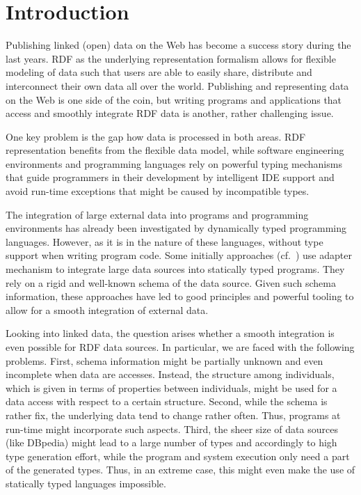 \documentclass{llncs} %
\begin{document}
\section{Introduction}
\label{sec:intro}


Publishing linked (open) data on the Web has become a success story during the last years.
RDF as the underlying representation formalism allows for flexible modeling of data such that
users are able to easily share, distribute and interconnect their own data all over the world.
Publishing and representing data on the Web is one side of the coin, but writing programs
and applications that access and smoothly integrate RDF data  is another, rather challenging issue.

One key problem is the  gap how data is processed in both areas.
RDF representation benefits from the flexible data model,
while software engineering environments and programming languages rely on powerful typing mechanisms
that guide programmers in their development by intelligent IDE support
and avoid run-time exceptions that might be caused by incompatible types.


The integration of large external data into programs and programming environments
has already been investigated by dynamically typed programming languages.
However, as it is in the nature of these languages, without type support when writing program code.
Some initially approaches (cf.~\cite{Syme2012fsharp}) use adapter mechanism to integrate large data sources into statically
typed programs. They rely on a rigid and well-known schema of the data source.
Given such schema information, these approaches have led to good principles and powerful tooling to
allow for a smooth integration of external data.

Looking into linked data, the question arises whether
a smooth integration is even possible for RDF data sources.
In particular, we are faced with the following problems.
First, schema information might be partially unknown and even incomplete when data are accesses.
Instead, the structure among individuals, which is given in terms of properties between individuals,
might be used for a data access with respect to a certain structure.
Second, while the schema is rather fix, the underlying data tend to change rather often.
Thus, programs at run-time might incorporate such aspects.
Third, the sheer size of data sources (like DBpedia)  might lead to a large number of types
and accordingly to high type generation effort, while the program and system execution
only need a part of the generated types.
Thus, in an extreme case, this might even make the use of statically typed languages impossible.
\end{document}
